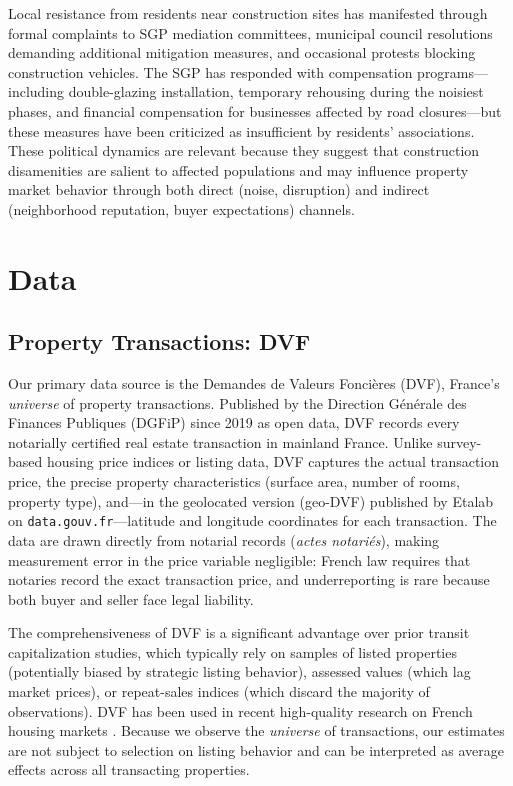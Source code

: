 \documentclass[12pt]{article}
\begin{document}
Local resistance from residents near construction sites has manifested through formal complaints to SGP mediation committees, municipal council resolutions demanding additional mitigation measures, and occasional protests blocking construction vehicles. The SGP has responded with compensation programs---including double-glazing installation, temporary rehousing during the noisiest phases, and financial compensation for businesses affected by road closures---but these measures have been criticized as insufficient by residents' associations. These political dynamics are relevant because they suggest that construction disamenities are salient to affected populations and may influence property market behavior through both direct (noise, disruption) and indirect (neighborhood reputation, buyer expectations) channels.


\section{Data}
\label{sec:data}

\subsection{Property Transactions: DVF}

Our primary data source is the Demandes de Valeurs Fonci\`eres (DVF), France's \textit{universe} of property transactions. Published by the Direction G\'{e}n\'{e}rale des Finances Publiques (DGFiP) since 2019 as open data, DVF records every notarially certified real estate transaction in mainland France. Unlike survey-based housing price indices or listing data, DVF captures the actual transaction price, the precise property characteristics (surface area, number of rooms, property type), and---in the geolocated version (geo-DVF) published by Etalab on \texttt{data.gouv.fr}---latitude and longitude coordinates for each transaction. The data are drawn directly from notarial records (\textit{actes notari\'{e}s}), making measurement error in the price variable negligible: French law requires that notaries record the exact transaction price, and underreporting is rare because both buyer and seller face legal liability.

The comprehensiveness of DVF is a significant advantage over prior transit capitalization studies, which typically rely on samples of listed properties (potentially biased by strategic listing behavior), assessed values (which lag market prices), or repeat-sales indices (which discard the majority of observations). DVF has been used in recent high-quality research on French housing markets \citep{combes2019costs}. Because we observe the \textit{universe} of transactions, our estimates are not subject to selection on listing behavior and can be interpreted as average effects across all transacting properties.
\end{document}
